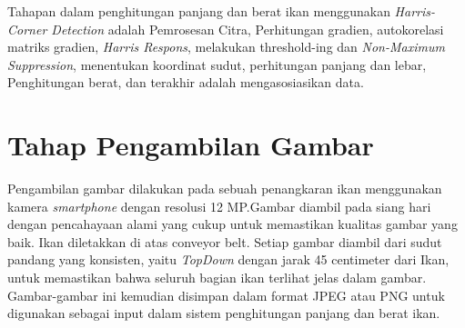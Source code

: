 Tahapan dalam penghitungan panjang dan berat ikan menggunakan \emph{Harris-Corner Detection} adalah Pemrosesan Citra, Perhitungan gradien, autokorelasi matriks gradien, \emph{Harris Respons}, melakukan threshold-ing dan \emph{Non-Maximum Suppression}, menentukan koordinat sudut, perhitungan panjang dan lebar, Penghitungan berat, dan terakhir adalah mengasosiasikan data.

\section{Tahap Pengambilan Gambar}
    Pengambilan gambar dilakukan pada sebuah penangkaran ikan menggunakan kamera \emph{smartphone} dengan resolusi 12 MP.\@ Gambar diambil pada siang hari dengan pencahayaan alami yang cukup untuk memastikan kualitas gambar yang baik. Ikan diletakkan di atas conveyor belt. Setiap gambar diambil dari sudut pandang yang konsisten, yaitu \emph{TopDown} dengan jarak 45 centimeter dari Ikan, untuk memastikan bahwa seluruh bagian ikan terlihat jelas dalam gambar. Gambar-gambar ini kemudian disimpan dalam format JPEG atau PNG untuk digunakan sebagai input dalam sistem penghitungan panjang dan berat ikan.


